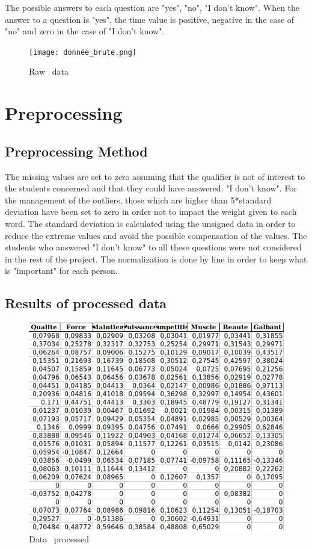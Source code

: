 \documentclass[12pt]{article}
\begin{document}
The possible answers to each question are "yes", "no", "I don't know". When the answer to a question is "yes", the time value is positive, negative in the case of "no" and zero in the case of "I don't know".


\begin{figure}[h]
\begin{center}
\texttt{[image: donnée\_brute.png]} 
\caption[]{ Raw \ data}
\end{center}
\end{figure}


\section{Preprocessing}

\subsection{Preprocessing Method}

The missing values are set to zero assuming that the qualifier is not of interest to the students concerned and that they could have answered: "I don't know".
For the management of the outliers, those which are higher than 5*standard deviation have been set to zero in order not to impact the weight given to each word. The standard deviation is calculated using the unsigned data in order to reduce the extreme values and avoid the possible compensation of the values.
The students who answered "I don't know" to all these questions were not considered in the rest of the project.  
The normalization is done by line in order to keep what is "important" for each person. 



\subsection{Results of processed data}

\begin{figure}[h]
\begin{center}
\includegraphics[scale=0.7]{donnée_nettoyé.png} 
\caption[]{Data \ processed }
\end{center}
\end{figure}
\end{document}
